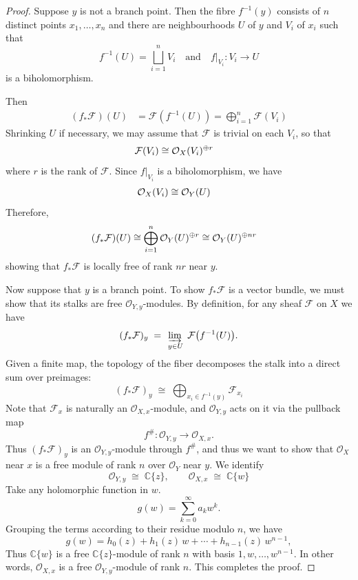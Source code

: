 \documentclass[12pt]{article}
\begin{document}
\begin{proof}
    Suppose $y$ is not a branch point.
    Then the fibre $f^{-1}(y)$ consists of $n$ distinct points $x_1,\dots,x_n$ and there are neighbourhoods $U$ of $y$ and $V_i$ of $x_i$ such that
    \[f^{-1}(U) = \bigsqcup_{i=1}^n V_i \quad\text{and}\quad f|_{V_i} : V_i \to U\] is a biholomorphism.

    Then \begin{align*}
        (f_*\mathcal{F})(U) & = \mathcal{F}(f^{-1}(U)) = \bigoplus_{i=1}^n \mathcal{F}(V_i)
    \end{align*}
    Shrinking $U$ if necessary, we may assume that $\mathcal{F}$ is trivial on each $V_i$, so that \begin{align*}
        \mathcal{F}(V_i) & \cong {\mathcal{O}}_X(V_i)^{\oplus r}
    \end{align*} where $r$ is the rank of $\mathcal{F}$. Since $f|_{V_i}$ is a biholomorphism, we have \begin{align*}
        {\mathcal{O}}_X(V_i) & \cong {\mathcal{O}}_Y(U)
    \end{align*} Therefore, \begin{align*}
        (f_*\mathcal{F})(U) & \cong \bigoplus_{i=1}^n {\mathcal{O}}_Y(U)^{\oplus r} \cong {\mathcal{O}}_Y(U)^{\oplus nr}
    \end{align*} showing that $f_*\mathcal{F}$ is locally free of rank $nr$ near $y$.

    Now suppose that $y$ is a branch point. To show $f_*\mathcal{F}$ is a vector bundle, we must show that its stalks are free $\mathcal O_{Y,y}$-modules. By definition, for any sheaf $\mathcal F$ on $X$ we have
    \[
        (f_*\mathcal F)_y \;=\; \varinjlim_{\,y\in U}\; \mathcal F\bigl(f^{-1}(U)\bigr).
    \]
    Given a finite map, the topology of the fiber decomposes the stalk into a direct sum over preimages:
    \[(f_*\mathcal F)_y \;\cong\; \bigoplus_{x_i\in f^{-1}(y)} \mathcal F_{x_i}\]
    Note that $\mathcal F_x$ is naturally an $\mathcal O_{X,x}$-module, and $\mathcal O_{Y,y}$ acts on it via the pullback map
    \[
        f^\#:\mathcal O_{Y,y}\longrightarrow \mathcal O_{X,x}.
    \]
    Thus $(f_*\mathcal F)_y$ is an $\mathcal O_{Y,y}$-module through $f^\#$, and thus we want to show that $\mathcal O_X$ near $x$ is a free module of rank $n$ over $\mathcal O_Y$ near $y$. We identify
    \[\mathcal O_{Y,y} \;\cong\; \mathbb C\{z\}, \qquad
        \mathcal O_{X,x} \;\cong\; \mathbb C\{w\}\]
    Take any holomorphic function in $w$.
    \[
        g(w)=\sum_{k=0}^\infty a_k w^k.
    \]
    Grouping the terms according to their residue modulo $n$, we have
    \[
        g(w)=h_0(z)+h_1(z)\,w+\cdots+h_{n-1}(z)\,w^{n-1},
    \]
    Thus $\mathbb{C}\{w\}$ is a free $\mathbb{C}\{z\}$-module of rank $n$ with basis $1,w,\dots,w^{n-1}$. In other words, $\mathcal O_{X,x}$ is a free $\mathcal O_{Y,y}$-module of rank $n$. This completes the proof.
\end{proof}
\end{document}
